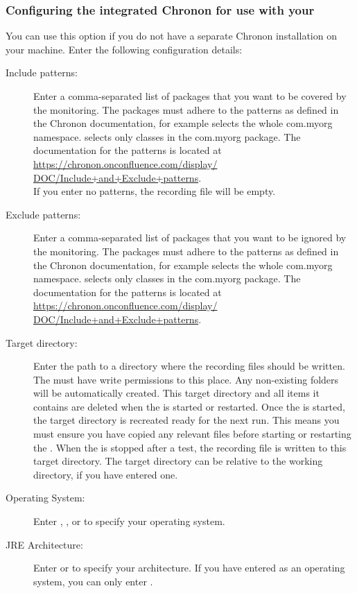 \subsubsection{Configuring the integrated Chronon for use with your \gdaut{}}
\label{TasksChrononAUTIntegrated}
You can use this option if you do not have a separate Chronon installation on your machine. Enter the following configuration details:
\begin{description}
\item [Include patterns:]{Enter a comma-separated list of packages that you want to be covered by the monitoring. The packages must adhere to the patterns as defined in the Chronon documentation, for example  selects the whole com.myorg namespace.  selects only classes in the com.myorg package. The documentation for the patterns is located at \\
\href{https://chronon.onconfluence.com/display/DOC/Include+and+Exclude+patterns}{https://chronon.onconfluence.com/display/\\
DOC/Include+and+Exclude+patterns}.\\
 If you enter no patterns, the recording file will be empty.}
\item [Exclude patterns:]{Enter a comma-separated list of packages that you want to be ignored by the monitoring. The packages must adhere to the patterns as defined in the Chronon documentation, for example  selects the whole com.myorg namespace.  selects only classes in the com.myorg package. The documentation for the patterns is located at \\
\href{https://chronon.onconfluence.com/display/DOC/Include+and+Exclude+patterns}{https://chronon.onconfluence.com/display/\\
DOC/Include+and+Exclude+patterns}.}
\item [Target directory:]{Enter the path to a directory where the recording files should be written. The \gdaut{} must have write permissions to this place. Any non-existing folders will be automatically created. This target directory and all items it contains are deleted when the \gdaut{} is started or restarted. Once the \gdaut{} is started, the target directory is recreated ready for the next run. This means you must ensure you have copied any relevant files before starting or restarting the \gdaut{}. When the \gdaut{} is stopped after a test, the recording file is written to this target directory. The target directory can be relative to the \gdaut{} working directory, if you have entered one.}
\item [Operating System:]{Enter , ,  or  to specify your operating system. }
\item[JRE Architecture:]{Enter  or  to specify your architecture. If you have entered  as an operating system, you can only enter .}
\end{description}

